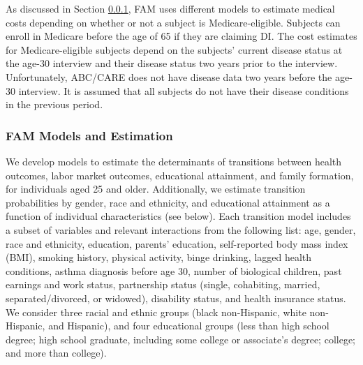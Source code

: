 \noindent As discussed in Section \ref{section:FAM_models}, FAM uses different models to estimate medical costs depending on whether or not a subject is Medicare-eligible. Subjects can enroll in Medicare before the age of 65 if they are claiming DI. The cost estimates for Medicare-eligible subjects depend on the subjects' current disease status at the age-30 interview and their disease status two years prior to the interview. Unfortunately, ABC/CARE does not have disease data two years before the age-30 interview. It is assumed that all subjects do not have their disease conditions in the previous period.





\subsubsection{FAM Models and Estimation}
\label{section:FAM_models}

\noindent We develop models to estimate the determinants of transitions between health outcomes, labor market outcomes, educational attainment, and family formation, for individuals aged 25 and older.
Additionally, we estimate transition probabilities by gender, race and ethnicity, and educational attainment as a function of individual characteristics (see below).
Each transition model includes a subset of variables and relevant interactions from the following list: age, gender, race and ethnicity, education, parents' education, self-reported body mass index (BMI), smoking history, physical activity, binge drinking, lagged health conditions, asthma diagnosis before age 30, number of biological children, past earnings and work status, partnership status (single, cohabiting, married, separated/divorced, or widowed), disability status, and health insurance status.
We consider three racial and ethnic groups (black non-Hispanic, white non-Hispanic, and Hispanic), and four educational groups (less than high school degree; high school graduate, including some college or associate's degree; college; and more than college).

